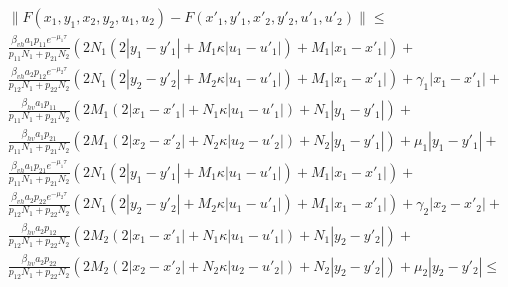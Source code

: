 \documentclass[bulgarian, 12pt]{article}
\begin{document}
\begin{align*}
  &\|F(x_1, y_1, x_2, y_2, u_1, u_2) - F(x'_1, y'_1, x'_2, y'_2, u'_1, u'_2)\| \leq \\
  &\frac{\beta_{vh} a_1 p_{11} e^{-\mu_1 \tau}}{p_{11} N_1 + p_{21} N_2} (2 N_1 (2|y_1 - y'_1| + M_1 \kappa |u_1 - u'_1|) + M_1 |x_1 - x'_1|) + \\
  &\frac{\beta_{vh} a_2 p_{12} e^{-\mu_2 \tau}}{p_{12} N_1 + p_{22} N_2}(2 N_1 (2|y_2 - y'_2| + M_2 \kappa |u_1 - u'_1|) + M_1 |x_1 - x'_1|) + \gamma_1 |x_1-x'_1| + \\
  &\frac{\beta_{hv} a_1 p_{11}}{p_{11} N_1 + p_{21} N_2} (2 M_1 (2|x_1 - x'_1| + N_1 \kappa |u_1 - u'_1|) + N_1 |y_1 - y'_1|) + \\
  &\frac{\beta_{hv} a_1 p_{21}}{p_{11} N_1 + p_{21} N_2} (2 M_1 (2|x_2 - x'_2| + N_2 \kappa |u_2 - u'_2|) + N_2 |y_1 - y'_1|) + \mu_1 |y_1 - y'_1| + \\
  &\frac{\beta_{vh} a_1 p_{21} e^{-\mu_1 \tau}}{p_{11} N_1 + p_{21} N_2} (2 N_1 (2|y_1 - y'_1| + M_1 \kappa |u_1 - u'_1|) + M_1 |x_1 - x'_1|) + \\
  &\frac{\beta_{vh} a_2 p_{22} e^{-\mu_2 \tau}}{p_{12} N_1 + p_{22} N_2}(2 N_1 (2|y_2 - y'_2| + M_2 \kappa |u_1 - u'_1|) + M_1 |x_1 - x'_1|) + \gamma_2 |x_2-x'_2| + \\
  &\frac{\beta_{hv} a_2 p_{12}}{p_{12} N_1 + p_{22} N_2} (2 M_2 (2|x_1 - x'_1| + N_1 \kappa |u_1 - u'_1|) + N_1 |y_2 - y'_2|) + \\
  &\frac{\beta_{hv} a_2 p_{22}}{p_{12} N_1 + p_{22} N_2} (2 M_2 (2|x_2 - x'_2| + N_2 \kappa |u_2 - u'_2|) + N_2 |y_2 - y'_2|) + \mu_2 |y_2 - y'_2| \leq
\end{align*}
\end{document}
